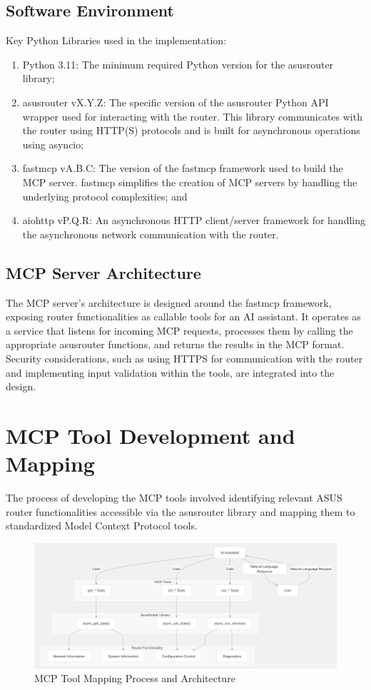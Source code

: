 \subsection{Software Environment}
Key Python Libraries used in the implementation:
\begin{enumerate}
\item Python 3.11: The minimum required Python version for the asusrouter library;
\item asusrouter vX.Y.Z: The specific version of the asusrouter Python API wrapper used for interacting with the router. This library communicates with the router using HTTP(S) protocols and is built for asynchronous operations using asyncio;
\item fastmcp vA.B.C: The version of the fastmcp framework used to build the MCP server. fastmcp simplifies the creation of MCP servers by handling the underlying protocol complexities; and
\item aiohttp vP.Q.R: An asynchronous HTTP client/server framework for handling the asynchronous network communication with the router.
\end{enumerate}
\subsection{MCP Server Architecture}
The MCP server's architecture is designed around the fastmcp framework, exposing router functionalities as callable tools for an AI assistant. It operates as a service that listens for incoming MCP requests, processes them by calling the appropriate asusrouter functions, and returns the results in the MCP format. Security considerations, such as using HTTPS for communication with the router and implementing input validation within the tools, are integrated into the design.
\section{MCP Tool Development and Mapping}
The process of developing the MCP tools involved identifying relevant ASUS router functionalities accessible via the asusrouter library and mapping them to standardized Model Context Protocol tools.
\begin{figure}
\centering
\includegraphics[width=1\linewidth]{architecture.png}
\caption{MCP Tool Mapping Process and Architecture}
\label{fig:mcp-mapping}
\end{figure}
